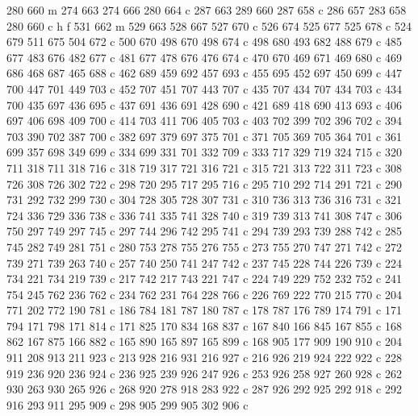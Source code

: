 {{        280 660 m
        274 663 274 666 280 664 c
        287 663 289 660 287 658 c
        286 657 283 658 280 660 c
        h f
        531 662 m
        529 663 528 667 527 670 c
        526 674 525 677 525 678 c
        524 679 511 675 504 672 c
        500 670 498 670 498 674 c
        498 680 493 682 488 679 c
        485 677 483 676 482 677 c
        481 677 478 676 476 674 c
        470 670 469 671 469 680 c
        469 686 468 687 465 688 c
        462 689 459 692 457 693 c
        455 695 452 697 450 699 c
        447 700 447 701 449 703 c
        452 707 451 707 443 707 c
        435 707 434 707 434 703 c
        434 700 435 697 436 695 c
        437 691 436 691 428 690 c
        421 689 418 690 413 693 c
        406 697 406 698 409 700 c
        414 703 411 706 405 703 c
        403 702 399 702 396 702 c
        394 703 390 702 387 700 c
        382 697 379 697 375 701 c
        371 705 369 705 364 701 c
        361 699 357 698 349 699 c
        334 699 331 701 332 709 c
        333 717 329 719 324 715 c
        320 711 318 711 318 716 c
        318 719 317 721 316 721 c
        315 721 313 722 311 723 c
        308 726 308 726 302 722 c
        298 720 295 717 295 716 c
        295 710 292 714 291 721 c
        290 731 292 732 299 730 c
        304 728 305 728 307 731 c
        310 736 313 736 316 731 c
        321 724 336 729 336 738 c
        336 741 335 741 328 740 c
        319 739 313 741 308 747 c
        306 750 297 749 297 745 c
        297 744 296 742 295 741 c
        294 739 293 739 288 742 c
        285 745 282 749 281 751 c
        280 753 278 755 276 755 c
        273 755 270 747 271 742 c
        272 739 271 739 263 740 c
        257 740 250 741 247 742 c
        237 745 228 744 226 739 c
        224 734 221 734 219 739 c
        217 742 217 743 221 747 c
        224 749 229 752 232 752 c
        241 754 245 762 236 762 c
        234 762 231 764 228 766 c
        226 769 222 770 215 770 c
        204 771 202 772 190 781 c
        186 784 181 787 180 787 c
        178 787 176 789 174 791 c
        171 794 171 798 171 814 c
        171 825 170 834 168 837 c
        167 840 166 845 167 855 c
        168 862 167 875 166 882 c
        165 890 165 897 165 899 c
        168 905 177 909 190 910 c
        204 911 208 913 211 923 c
        213 928 216 931 216 927 c
        216 926 219 924 222 922 c
        228 919 236 920 236 924 c
        236 925 239 926 247 926 c
        253 926 258 927 260 928 c
        262 930 263 930 265 926 c
        268 920 278 918 283 922 c
        287 926 292 925 292 918 c
        292 916 293 911 295 909 c
        298 905 299 905 302 906 c
}}
